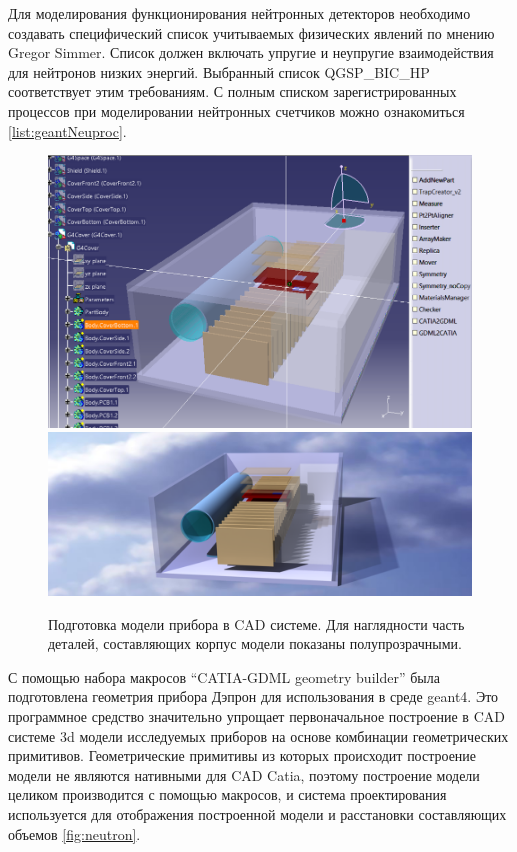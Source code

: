 Для моделирования функционирования нейтронных детекторов необходимо создавать специфический список учитываемых физических явлений по мнению Gregor Simmer\cite{Simmer2007}. Список должен включать упругие и неупругие взаимодействия для нейтронов низких энергий. Выбранный список QGSP\_BIC\_HP соответствует этим требованиям. С полным списком зарегистрированных процессов при моделировании нейтронных счетчиков можно ознакомиться \ref{list:geantNeuproc}.
\begin{figure}
	\centering
	\includegraphics[width=0.49\linewidth]{images/deproncatia2}
	\includegraphics[width=0.49\linewidth]{images/deproncatia}
	\caption[Модель прибора ДЭПРОН]{Подготовка модели прибора в CAD системе. Для наглядности часть деталей, составляющих корпус модели показаны полупрозрачными. }
	\label{fig:deproncatia2}
\end{figure}

С помощью набора макросов ``CATIA-GDML geometry builder''\cite{Belogurov2011a,Belogurov2014} была подготовлена геометрия прибора Дэпрон для использования в среде geant4. Это программное средство значительно упрощает первоначальное построение в CAD системе 3d модели исследуемых приборов на основе комбинации геометрических примитивов. Геометрические примитивы из которых происходит построение модели не являются нативными для CAD Catia, поэтому построение модели целиком производится с помощью макросов, и система проектирования используется для отображения построенной модели и расстановки составляющих объемов \ref{fig:neutron}.


